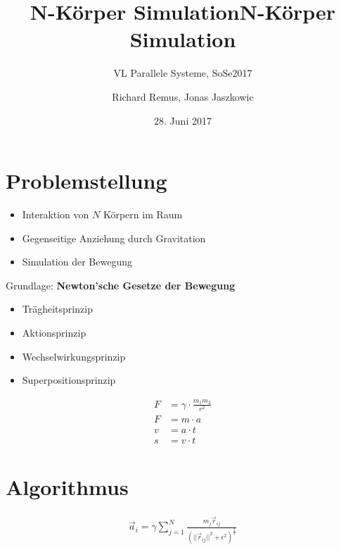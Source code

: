 \documentclass{beamer}
\begin{document}
\title{N-Körper Simulation}
\subtitle{VL Parallele Systeme, SoSe2017}
\author{Richard Remus, Jonas Jaszkowic}
\date{28. Juni 2017}

\begin{frame}
\title{N-Körper Simulation}
\titlepage
\end{frame}

\section{Problemstellung}
\begin{frame}
\begin{itemize}
  \item Interaktion von $N$ Körpern im Raum
  \item Gegenseitige Anziehung durch Gravitation
  \item Simulation der Bewegung
\end{itemize}
\end{frame}

\begin{frame}
  Grundlage: \textbf{Newton'sche Gesetze der Bewegung}
  \begin{itemize}
    \item Trägheitsprinzip
    \item Aktionsprinzip
    \item Wechselwirkungsprinzip
    \item Superpositionsprinzip
  \end{itemize}

\end{frame}

\begin{frame}
\begin{huge}
  \begin{align*}
  F &= \gamma \cdot \frac{m_1m_2}{r^2} \\
  F &= m \cdot a \\
  v &= a \cdot t \\
  s &= v \cdot t
\end{align*}
\end{huge}
\end{frame}

\section{Algorithmus}
\begin{frame}
\begin{center}
\begin{huge}
  \begin{align*}
    \vec{a}^{\,}_i = \gamma \sum\limits_{j=1}^N \frac{m_j  \vec{r}^{\,}_{ij}}{(|| \vec{r}^{\,}_{ij} ||^2 + \epsilon^2)^{\frac{3}{2}}}
  \end{align*}
\end{huge}
\end{center}
\end{frame}
\end{document}
